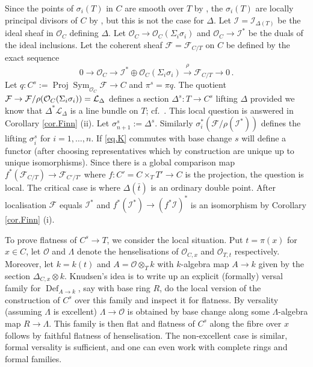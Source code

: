 \documentclass[a4paper,10pt]{amsart}
\theoremstyle{plain}
\theoremstyle{definition}
\theoremstyle{remark}
\numberwithin{equation}{xx}
\DeclareMathOperator{\Def}{Def}
\DeclareMathOperator{\Proj}{Proj}
\DeclareMathOperator{\Sym}{Sym}
\newcommand{\co}{\colon}
\newcommand{\ra}{\rightarrow}
\newcommand{\lra}{\longrightarrow}
\newcommand{\ot}{{\otimes}}
\newcommand{\vL}{\varLambda}
\newcommand{\df}[2]{{\Def}_{#2}^{#1}}
\newcommand{\mc}[1]{\mathcal{#1}}
\newcommand{\Q}{\mathcal{O}}
\newcommand{\xra}[1]{\xrightarrow{{#1}}}
\begin{document}
Since the points of \(\sigma_{i}(T)\) in \(C\) are smooth over \(T\) by \cite[6.7.8]{EGAIV2}, the \(\sigma_{i}(T)\) are locally principal divisors of \(C\) by \cite[17.10.4]{EGAIV4}, but this is not the case for \(\Delta\).  Let \(\mc{I}=\mc{I}_{\Delta(T)}\) be the ideal sheaf in \(\Q_{C}\) defining \(\Delta\). Let \(\Q_{C}\ra \Q_{C}(\Sigma_{i} \sigma_{i})\) and \(\Q_{C}\ra \mc{I}^{*}\) be the duals of the ideal inclusions. Let the coherent sheaf \(\mc{F}=\mc{F}_{C/T}\) on \(C\) be defined by the exact sequence
\begin{equation}\label{eq.K}
0\ra \Q_{C}\lra \mc{I}^{*}\oplus\Q_{C}(\Sigma_{i}\sigma_{i})\xra{\,\,\rho\,\,} \mc{F}_{C/T}\ra 0\,.
\end{equation}
Let \(q\co C^{s}:=\Proj\Sym_{\Q_{C}}\!\mc{F}\ra C\) and \(\pi^{s}=\pi q\). The quotient \(\mc{F}\ra \mc{F}/\rho(\Q_{C}(\Sigma_{i} \sigma_{i}))\linebreak[1]=\mc{L}_{\Delta}\) defines a section \(\Delta^{s}\co T\ra C^{s}\) lifting \(\Delta\) provided we know that \(\Delta^{*}\mc{L}_{\Delta}\) is a line bundle on \(T\); cf.\ \cite[4.2.3]{EGAII}. This local question is answered in Corollary \ref{cor.Finn} (ii). Let \(\sigma_{n+1}^{s}:=\Delta^{s}\). Similarly \(\sigma_{i}^{*}(\mc{F}/\rho(\mc{I}^{*}))\) defines the lifting \(\sigma_{i}^{s}\) for \(i=1,\dots,n\). If \eqref{eq.K} commutes with base change \(s\) will define a functor (after choosing representatives which by construction are unique up to unique isomorphisms). Since there is a global comparison map \(f^{*}(\mc{F}_{C/T})\ra \mc{F}_{C'/T'}\) where \(f\co C'=C{\times}_{T}T'\ra C\) is the projection, the question is local. The critical case is where \(\Delta(\bar{t})\) is an ordinary double point. After localisation \(\mc{F}\) equals \(\mc{I}^{*}\) and \(f^{*}(\mc{I}^{*})\ra (f^{*}\mc{I})^{*}\) is an isomorphism by Corollary \ref{cor.Finn} (i). 

To prove flatness of \(C^{s}\ra T\), we consider the local situation. Put \(t=\pi(x)\) for  \(x\in C\), let \(\Q\) and \(\vL\) denote the henselisations of \(\Q_{C,x}\) and \(\Q_{T,t}\) respectively. Moreover, let \(k=k(t)\) and \(A=\Q\ot_{T}k\) with \(k\)-algebra map \(A\ra k\) given by the section \(\Delta_{C,x}\ot k\). Knudsen's idea is to write up an explicit (formally) versal family for \(\df{}{A\ra k}\), say with base ring \(R\), do the local version of the construction of \(C^{s}\) over this family and inspect it for flatness. By versality (assuming \(\vL\) is excellent) \(\vL\ra\Q\) is obtained by base change along some \(\vL\)-algebra map \(R\ra\vL\). This family is then flat and flatness of \(C^{s}\) along the fibre over \(x\) follows by faithful flatness of henselisation. The non-excellent case is similar, formal versality is sufficient, and one can even work with complete rings and formal families. 
\end{document}
